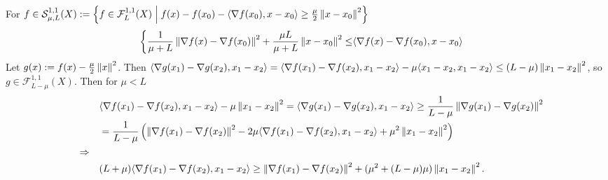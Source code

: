 \documentclass[12pt,english]{article}
\begin{document}
\begin{lemma}\label{lemma:}
%
For $f\in\mathcal S^{1,1}_{\mu,L}(X) := \left\{f\in \mathcal F^{1,1}_{L}(X)\;\middle|\;f(x) - f(x_0) - \langle\nabla f(x_0),x-x_0\rangle\ge \frac{\mu}{2} \left\|x-x_0\right\|^2\right\}$
%
%
\begin{equation}\label{eq:conv_lip_smooth}
%
\left\{
\begin{aligned}
\frac{1}{\mu+L} \norm{\nabla f(x) -\nabla f(x_0)}^2 + \frac{\mu L}{\mu+L}\norm{x-x_0}^2\le& \scp{\nabla f(x) -\nabla f(x_0)}{x-x_0}
\end{aligned}
\right.
\end{equation}
%
Let $g(x) := f(x) - \frac{\mu}{2}\left\|x\right\|^2$. Then $\langle\nabla g(x_1)-\nabla g(x_2),x_1-x_2\rangle = \langle\nabla f(x_1)-\nabla f(x_2),x_1-x_2\rangle - \mu\langle x_1-x_2,x_1-x_2\rangle \le (L-\mu)\left\|x_1-x_2\right\|^2$, so $g\in \mathcal F^{1,1}_{L-\mu}(X)$. Then for $\mu<L$
%
\begin{align*}
&\langle\nabla f(x_1)-\nabla f(x_2),x_1-x_2\rangle - \mu\left\|x_1-x_2\right\|^2 = \langle\nabla g(x_1)-\nabla g(x_2),x_1-x_2\rangle\ge \frac{1}{L-\mu}\left\|\nabla g(x_1)-\nabla g(x_2)\right\|^2\\
\quad&= \frac{1}{L-\mu}\left(\left\|\nabla f(x_1)-\nabla f(x_2)\right\|^2 -2\mu\langle\nabla f(x_1)-\nabla f(x_2),x_1-x_2\rangle + \mu^2\left\|x_1-x_2\right\|^2\right)\\
\quad\Rightarrow\quad \\
&(L+\mu)\langle\nabla f(x_1)-\nabla f(x_2),x_1-x_2\rangle \ge \left\|\nabla f(x_1)-\nabla f(x_2)\right\|^2 + (\mu^2+(L-\mu)\mu)\left\|x_1-x_2\right\|^2.
\end{align*}
\end{lemma}
%
%
\end{document}
